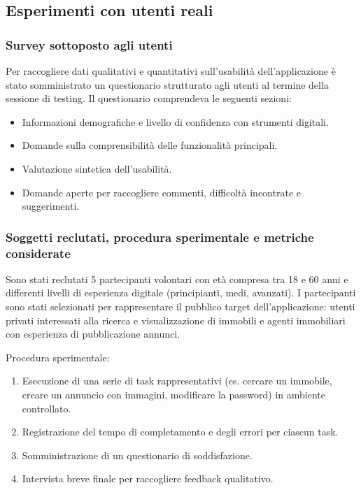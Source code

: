 \subsection{Esperimenti con utenti reali}

\subsubsection{Survey sottoposto agli utenti}

Per raccogliere dati qualitativi e quantitativi sull'usabilità dell'applicazione è stato somministrato un questionario strutturato agli utenti al termine della sessione di testing. Il questionario comprendeva le seguenti sezioni:
\begin{itemize}
    \item Informazioni demografiche e livello di confidenza con strumenti digitali.
    \item Domande sulla comprensibilità delle funzionalità principali.
    \item Valutazione sintetica dell'usabilità.
    \item Domande aperte per raccogliere commenti, difficoltà incontrate e suggerimenti.
\end{itemize}


\subsubsection{Soggetti reclutati, procedura sperimentale e metriche considerate}

Sono stati reclutati 5 partecipanti volontari con età compresa tra 18 e 60 anni e differenti livelli di esperienza digitale (principianti, medi, avanzati). I partecipanti sono stati selezionati per rappresentare il pubblico target dell'applicazione: utenti privati interessati alla ricerca e visualizzazione di immobili e agenti immobiliari con esperienza di pubblicazione annunci.

Procedura sperimentale:
\begin{enumerate}
    \item Esecuzione di una serie di task rappresentativi (es. cercare un immobile, creare un annuncio con immagini, modificare la password) in ambiente controllato.
    \item Registrazione del tempo di completamento e degli errori per ciascun task.
    \item Somministrazione di un questionario di soddisfazione.
    \item Intervista breve finale per raccogliere feedback qualitativo.
\end{enumerate}

